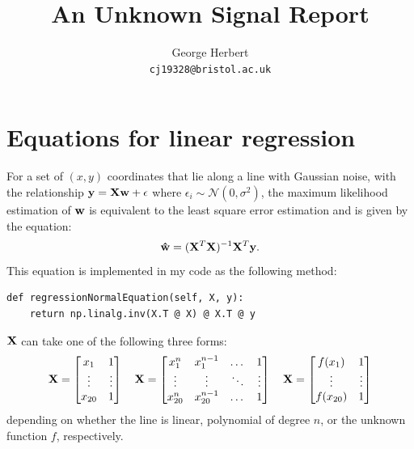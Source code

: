 \documentclass[onecolumn, 12pt, a4paper]{article}
\author{
  George Herbert\\
  \texttt{cj19328@bristol.ac.uk}
}
\title{An Unknown Signal Report}
\begin{document}
\maketitle


\section{Equations for linear regression}

For a set of $(x, y)$ coordinates that lie along a line with Gaussian noise, 
with the relationship $\vb{y} = \vb{X}\vb{w} + \vb{\epsilon}$ where $\epsilon_{i} \sim \mathcal{N}(0, \sigma^{2})$,
the maximum likelihood estimation of $\vb{w}$ is equivalent to
the least square error estimation and is given by the equation:
\[
    \vb{\hat{w}} = (\vb{X}^{T}\vb{X})^{-1}\vb{X}^{T}\vb{y}.
\]
This equation is implemented in my code as the following
method:
\begin{verbatim}
def regressionNormalEquation(self, X, y):
    return np.linalg.inv(X.T @ X) @ X.T @ y
\end{verbatim}

$\vb{X}$ can take one of the following
three forms:
\[
\vb{X} =
\begin{bmatrix}
    x_{1} & 1 \\
    \vdots & \vdots \\
    x_{20} & 1 \\
\end{bmatrix}
\quad
\vb{X} =
\begin{bmatrix}
    x_{1}^{n} & x_{1}^{n-1} & \dots & 1 \\
    \vdots & \vdots & \ddots & \vdots \\
    x_{20}^{n} & x_{20}^{n-1} & \dots & 1 \\
\end{bmatrix}
\quad
\vb{X} =
\begin{bmatrix}
    f(x_{1}) & 1 \\
    \vdots & \vdots \\
    f(x_{20}) & 1 \\
\end{bmatrix}
\]
depending on whether the line is linear, polynomial of degree $n$,
or the unknown function $f$, respectively.
\end{document}

